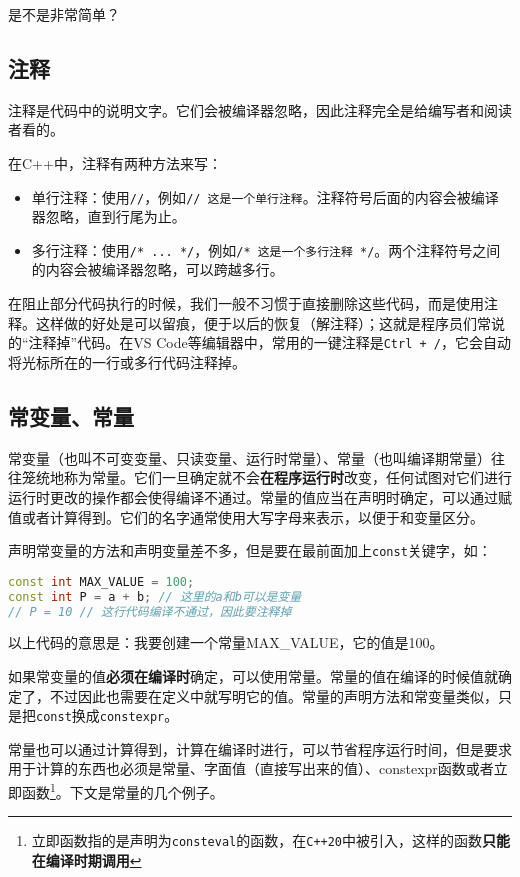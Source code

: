 是不是非常简单？

\subsection{注释}

注释是代码中的说明文字。它们会被编译器忽略，因此注释完全是给编写者和阅读者看的。

在C++中，注释有两种方法来写：
\begin{itemize}
  \item 单行注释：使用\texttt{//}，例如\texttt{// 这是一个单行注释}。注释符号后面的内容会被编译器忽略，直到行尾为止。
  \item 多行注释：使用\texttt{/* ... */}，例如\texttt{/* 这是一个多行注释 */}。两个注释符号之间的内容会被编译器忽略，可以跨越多行。
\end{itemize}

在阻止部分代码执行的时候，我们一般不习惯于直接删除这些代码，而是使用注释。这样做的好处是可以留痕，便于以后的恢复（解注释）；这就是程序员们常说的“注释掉”代码。在VS Code等编辑器中，常用的一键注释是\texttt{Ctrl + /}，它会自动将光标所在的一行或多行代码注释掉。

\subsection{常变量、常量}
常变量（也叫不可变变量、只读变量、运行时常量）、常量（也叫编译期常量）往往笼统地称为常量。它们一旦确定就不会\textbf{在程序运行时}改变，任何试图对它们进行运行时更改的操作都会使得编译不通过。常量的值应当在声明时确定，可以通过赋值或者计算得到。它们的名字通常使用大写字母来表示，以便于和变量区分。

声明常变量的方法和声明变量差不多，但是要在最前面加上\texttt{const}关键字，如：
\begin{lstlisting}[language=C++]
const int MAX_VALUE = 100;
const int P = a + b; // 这里的a和b可以是变量
// P = 10 // 这行代码编译不通过，因此要注释掉
\end{lstlisting}
以上代码的意思是：我要创建一个常量MAX\_VALUE，它的值是100。

如果常变量的值\textbf{必须在编译时}确定，可以使用常量。常量的值在编译的时候值就确定了，不过因此也需要在定义中就写明它的值。常量的声明方法和常变量类似，只是把\texttt{const}换成\texttt{constexpr}。

常量也可以通过计算得到，计算在编译时进行，可以节省程序运行时间，但是要求用于计算的东西也必须是常量、字面值（直接写出来的值）、constexpr函数或者立即函数\footnote{立即函数指的是声明为\texttt{consteval}的函数，在\texttt{C++20}中被引入，这样的函数\textbf{只能在编译时期调用}}。下文是常量的几个例子。

